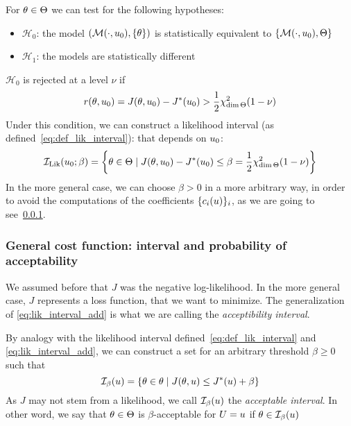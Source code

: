 \documentclass[../../Main_ManuscritThese.tex]{subfiles}
\begin{document}
 For $\theta\in \Theta$ we can test for the following hypotheses:
 \begin{itemize}
 \item $\mathcal{H}_0$: the model $\left(\mathcal{M}(\cdot, u_0), \{\theta\}\right)$ is statistically equivalent to $\left\{\mathcal{M}(\cdot, u_0), \Theta\right\}$
 \item $\mathcal{H}_1$: the models are statistically different
 \end{itemize}
 $\mathcal{H}_0$ is rejected at a level $\nu$ if
  \begin{align}
  r(\theta, u_0)=J(\theta, u_0) - J^*(u_0) > \frac{1}{2}\chi^2_{\dim \Theta}(1-\nu)
  \end{align}
  Under this condition, we can construct a likelihood interval (as defined~\cref{eq:def_lik_interval}): that depends on $u_0$:
  \begin{equation}
    \label{eq:lik_interval_add}
    \mathcal{I}_{\mathrm{Lik}}(u_0; \beta) = \left\{\theta\in \Theta \mid  J(\theta, u_0) - J^*(u_0) \leq \beta=\frac{1}{2}\chi^2_{\dim \Theta}(1-\nu)\right\}
  \end{equation}
  In the more general case, we can choose $\beta>0$ in a more arbitrary way, in order to avoid the computations of the coefficients $\{c_i(u)\}_i$, as we are going to see~\cref{ssec:general_cost_prob}.

  
  \subsubsection{General cost function: interval and probability of acceptability}
     \label{ssec:general_cost_prob}
 We assumed before that $J$ was the negative log-likelihood. In the more general case, $J$ represents a loss function, that we want to minimize. The generalization of \cref{eq:lik_interval_add} is what we are calling the \emph{acceptibility interval}.
  \begin{definition}
  By analogy with the likelihood interval defined~\cref{eq:def_lik_interval} and \cref{eq:lik_interval_add}, we can construct a set for an arbitrary threshold $\beta \geq 0$ such that
  \begin{equation}
    \mathcal{I}_{\beta}(u) = \left\{\theta \in \theta \mid J(\theta,u) \leq J^*(u) + \beta \right\}
  \end{equation}
As $J$ may not stem from a likelihood, we call $\mathcal{I}_{\beta}(u)$ the \emph{acceptable interval}. In other word, we say that $\theta\in \Theta$ is $\beta$-acceptable for $U=u$ if $\theta \in \mathcal{I}_{\beta}(u)$
\end{definition}
\end{document}
